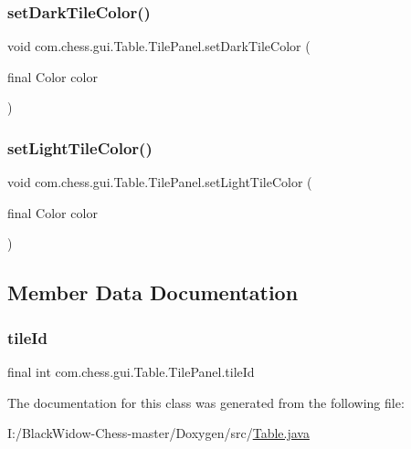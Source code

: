 \subsubsection{\texorpdfstring{setDarkTileColor()}{setDarkTileColor()}}
{\footnotesize\ttfamily void com.\+chess.\+gui.\+Table.\+Tile\+Panel.\+set\+Dark\+Tile\+Color (\begin{DoxyParamCaption}\item[{final Color}]{color }\end{DoxyParamCaption})\hspace{0.3cm}{\ttfamily [package]}}

\mbox{\label{classcom_1_1chess_1_1gui_1_1_table_1_1_tile_panel_aecd6ea783d7df0dc8269babd2502cdc1}} 
\subsubsection{\texorpdfstring{setLightTileColor()}{setLightTileColor()}}
{\footnotesize\ttfamily void com.\+chess.\+gui.\+Table.\+Tile\+Panel.\+set\+Light\+Tile\+Color (\begin{DoxyParamCaption}\item[{final Color}]{color }\end{DoxyParamCaption})\hspace{0.3cm}{\ttfamily [package]}}



\subsection{Member Data Documentation}
\mbox{\label{classcom_1_1chess_1_1gui_1_1_table_1_1_tile_panel_a0ff1e0f6414184421961bfa3f8e271fa}} 
\subsubsection{\texorpdfstring{tileId}{tileId}}
{\footnotesize\ttfamily final int com.\+chess.\+gui.\+Table.\+Tile\+Panel.\+tile\+Id\hspace{0.3cm}{\ttfamily [private]}}



The documentation for this class was generated from the following file\+:\begin{DoxyCompactItemize}
\item 
I\+:/\+Black\+Widow-\/\+Chess-\/master/\+Doxygen/src/\mbox{\hyperlink{_table_8java}{Table.\+java}}\end{DoxyCompactItemize}
